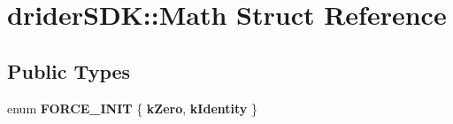 \hypertarget{structdrider_s_d_k_1_1_math}{}\section{drider\+S\+DK\+:\+:Math Struct Reference}
\label{structdrider_s_d_k_1_1_math}
\subsection*{Public Types}
\begin{DoxyCompactItemize}
\item 
\mbox{\label{structdrider_s_d_k_1_1_math_af7adf3f4a348dfa0f1eb5532acab60e3}} 
enum {\bfseries F\+O\+R\+C\+E\+\_\+\+I\+N\+IT} \{ {\bfseries k\+Zero}, 
{\bfseries k\+Identity}
 \}
\end{DoxyCompactItemize}
